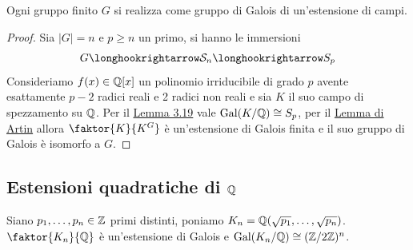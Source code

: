 \documentclass[11pt]{scrartcl}
\begin{document}
	\begin{proposition}
		Ogni gruppo finito $G$ si realizza come gruppo di Galois di un'estensione
		di campi.
	\end{proposition}
	
	\begin{proof}
		Sia $|G| = n$ e $p \geq n$ un primo, si hanno le immersioni
		\[
		G \longhookrightarrow \mathcal{S}_n \longhookrightarrow S_p
		\]
		Consideriamo $f(x) \in \mathbb Q[x]$ un polinomio irriducibile di grado $p$
		avente esattamente $p - 2$ radici reali e 2 radici non reali e sia $K$ 
		il suo campo di spezzamento su $\mathbb Q$. Per il \hyperref[lemma3.19]{Lemma 3.19}
		vale $\operatorname{Gal}(K/\mathbb Q) \cong S_p$, per il \hyperref[lemma3.20]{Lemma di Artin}
		allora $\faktor{K}{K^G}$ è un'estensione di Galois finita e il suo gruppo
		di Galois è isomorfo a $G$.
	\end{proof}
	
	\newpage
	
	\subsection{Estensioni quadratiche di \texorpdfstring{$\mathbb Q$}{ℚ}}
	
	\begin{theorem}
		Siano $p_1, \ldots, p_n \in \mathbb Z$ primi distinti, poniamo $K_n = 
		\mathbb Q(\sqrt{p_1}, \ldots, \sqrt{p_n})$. $\faktor{K_n}{\QQ}$ è un'estensione
		di Galois e $\operatorname{Gal}(K_n/\mathbb Q) \cong (\mathbb{Z}/{2}\mathbb{Z})^n$.
	\end{theorem}
	
\end{document}
